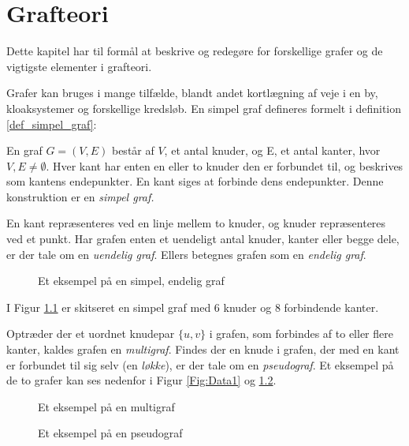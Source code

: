 \chapter{Grafteori}
\usetikzlibrary{arrows, automata}

Dette kapitel har til formål at beskrive og redegøre for forskellige grafer og de vigtigste elementer i grafteori. 

Grafer kan bruges i mange tilfælde, blandt andet kortlægning af veje i en by, kloaksystemer og forskellige kredsløb.
En simpel graf defineres formelt i definition \ref{def_simpel_graf}:


\begin{defn}
En graf $G = (V, E)$ består af $V$, et antal knuder, og E, et antal kanter, hvor $V, E \neq \emptyset$.
Hver kant har enten en eller to knuder den er forbundet til, og beskrives som kantens endepunkter.
En kant siges at forbinde dens endepunkter. Denne konstruktion er en \it{simpel graf}.
\label{def_simpel_graf}
\end{defn}

\noindent En kant repræsenteres ved en linje mellem to knuder, og knuder repræsenteres ved et punkt.
Har grafen enten et uendeligt antal knuder, kanter eller begge dele, er der tale om en \textit{uendelig graf}.
Ellers betegnes grafen som en \textit{endelig graf}.

\begin{figure}[h]
	\centering
	
	\caption{Et eksempel på en simpel, endelig graf} \label{simpel_graf}
\end{figure}


I Figur \ref{simpel_graf} er skitseret en simpel graf med $6$ knuder og $8$ forbindende kanter. 

Optræder der et uordnet knudepar $\lbrace u,v \rbrace$ i grafen, som forbindes af to eller flere kanter, kaldes grafen en \textit{multigraf}.
Findes der en knude i grafen, der med en kant er forbundet til sig selv (en \textit{løkke}), er der tale om en \textit{pseudograf}. Et eksempel på de to grafer kan ses nedenfor i Figur \ref{Fig:Data1} og \ref{Fig:Data2}.

\begin{figure}[!htb]
   \begin{minipage}{0.48\textwidth}
     \centering
     
     \caption{Et eksempel på en multigraf}\label{Fig:Data1}
   \end{minipage}\hfill
   \begin{minipage}{0.48\textwidth}
     \centering
     
     \caption{Et eksempel på en pseudograf}\label{Fig:Data2}
   \end{minipage}
\end{figure}

